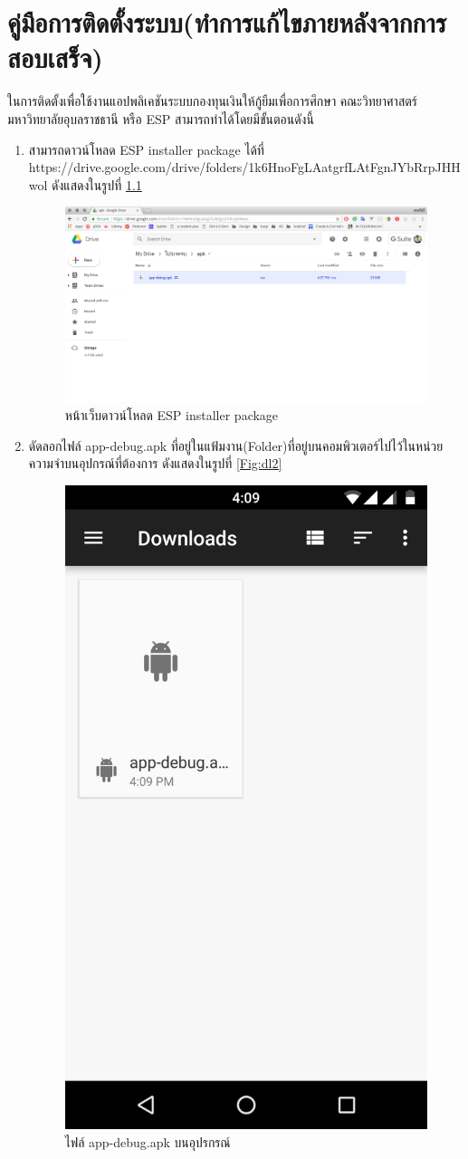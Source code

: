 \chapter{คู่มือการติดตั้งระบบ(ทำการแก้ไขภายหลังจากการสอบเสร็จ)}
ในการติดตั้งเพื่อใช้งานแอปพลิเคชันระบบกองทุนเงินให้กู้ยืมเพื่อการศึกษา คณะวิทยาศาสตร์ มหาวิทยาลัยอุบลราชธานี หรือ ESP สามารถทำได้โดยมีขั้นตอนดังนี้
\begin{enumerate}
	\item สามารถดาวน์โหลด ESP installer package ได้ที่ https://drive.google.com/drive/folders/1k6HnoFgLAatgrfLAtFgnJYbRrpJHHwol ดังแสดงในรูปที่ \ref{Fig:dl1}
	\begin{figure}[H]
		\centering
		\includegraphics[width=\columnwidth]{Figures/7/installApp/dl}
		\caption{หน้าเว็บดาวน์โหลด ESP installer package}
		\label{Fig:dl1}
	\end{figure}
	\item ดัดลอกไฟล์ app-debug.apk ที่อยู่ในแฟ้มงาน(Folder)ที่อยู่บนคอมพิวเตอร์ไปไว้ในหน่วยความจำบนอุปกรณ์ที่ต้องการ ดังแสดงในรูปที่ \ref{Fig:dl2}
	\begin{figure}[H]
		\centering
		\includegraphics[width=0.3\columnwidth]{Figures/7/installApp/1}
		\caption{ไฟล์ app-debug.apk บนอุปรกรณ์}

\end{figure}
\end{enumerate}
